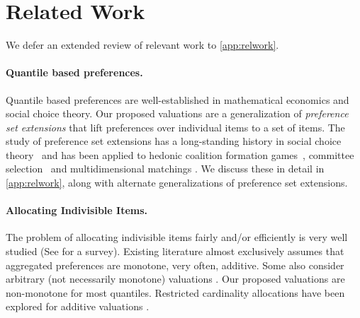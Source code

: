 \section{Related Work}
We defer an extended review of relevant work to \cref{app:relwork}. %



 \paragraph{Quantile based preferences. } Quantile based preferences are well-established in mathematical economics and social choice theory. %
 Our proposed  valuations are a generalization of \textit{preference set extensions} that lift preferences over individual items to a set of items. The study of preference set extensions has a long-standing history in social choice theory~\citep{BBP04a} and has been applied to hedonic coalition formation games~\citep{CeHa2003computational,CeHa2004stable}, committee selection~\citep{AzMo20a} and multidimensional matchings \citep{HNR2025strategyproof}. %
 We discuss these in detail in \cref{app:relwork}, along with alternate generalizations of preference set extensions. %

 

\paragraph{Allocating Indivisible Items.} The problem of allocating indivisible items fairly and/or efficiently is very well studied (See \cite{AAB+2022fair} for a survey). Existing literature almost exclusively assumes that aggregated preferences are monotone, very often, additive\citep{CKM+2019unreasonable,ACIW2022fair}. Some also consider arbitrary (not necessarily monotone) valuations \citep{BBB+2024envy,BBPP2024nearly}. Our proposed valuations are non-monotone for most quantiles.  
%
Restricted cardinality allocations have been explored for additive valuations \citep{SHS2023efficient,BiBa2018fair,CaNa2024repeatedly}. %

